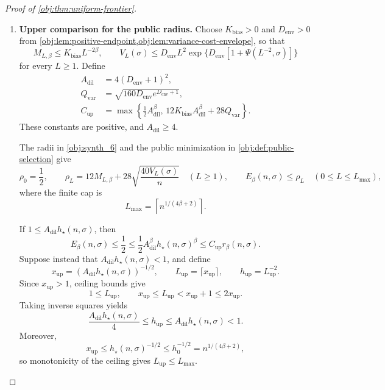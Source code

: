 \documentclass[11pt]{article}
\begin{document}
\begin{proof}[Proof of \cref{obj:thm:uniform-frontier}]
\begin{enumerate}
\item \textbf{Upper comparison for the public radius.}
Choose \(K_{\mathrm{bias}}>0\) and \(D_{\mathrm{env}}>0\) from
\cref{obj:lem:positive-endpoint,obj:lem:variance-cost-envelope}, so that
\[
M_{L,\beta}\le K_{\mathrm{bias}}L^{-2\beta},
\qquad
V_L(\sigma)\le D_{\mathrm{env}}L^2
 \exp\{D_{\mathrm{env}}[1+\Psi(L^{-2},\sigma)]\}
\]
for every \(L\ge1\). Define
\[
\begin{aligned}
A_{\mathrm{dil}}&=4(D_{\mathrm{env}}+1)^2,\\
Q_{\mathrm{var}}&=\sqrt{160D_{\mathrm{env}}e^{D_{\mathrm{env}}+1}},\\
C_{\mathrm{up}}&=\max\left\{
 \frac12A_{\mathrm{dil}}^\beta,\,
 12K_{\mathrm{bias}}A_{\mathrm{dil}}^\beta+28Q_{\mathrm{var}}
 \right\}.
\end{aligned}
\]
These constants are positive, and \(A_{\mathrm{dil}}\ge4\).

The radii in \cref{obj:synth_6} and the public minimization in
\cref{obj:def:public-selection} give
\[
\rho_0=\frac12,\qquad
\rho_L=12M_{L,\beta}+28\sqrt{\frac{40V_L(\sigma)}n}\quad(L\ge1),
\qquad
E_\beta(n,\sigma)\le\rho_L\quad(0\le L\le L_{\max}),
\]
where the finite cap is
\[
L_{\max}=\left\lceil n^{1/(4\beta+2)}\right\rceil.
\]

If \(1\le A_{\mathrm{dil}}h_\star(n,\sigma)\), then
\[
E_\beta(n,\sigma)\le\frac12
\le\frac12A_{\mathrm{dil}}^\beta h_\star(n,\sigma)^\beta
\le C_{\mathrm{up}}r_\beta(n,\sigma).
\]
Suppose instead that \(A_{\mathrm{dil}}h_\star(n,\sigma)<1\), and define
\[
x_{\mathrm{up}}
=(A_{\mathrm{dil}}h_\star(n,\sigma))^{-1/2},
\qquad
L_{\mathrm{up}}=\lceil x_{\mathrm{up}}\rceil,
\qquad
h_{\mathrm{up}}=L_{\mathrm{up}}^{-2}.
\]
Since \(x_{\mathrm{up}}>1\), ceiling bounds give
\[
1\le L_{\mathrm{up}},
\qquad
x_{\mathrm{up}}\le L_{\mathrm{up}}
<x_{\mathrm{up}}+1\le2x_{\mathrm{up}}.
\]
Taking inverse squares yields
\[
\frac{A_{\mathrm{dil}}h_\star(n,\sigma)}4
\le h_{\mathrm{up}}
\le A_{\mathrm{dil}}h_\star(n,\sigma)<1.
\]
Moreover,
\[
x_{\mathrm{up}}
\le h_\star(n,\sigma)^{-1/2}
\le h_0^{-1/2}
=n^{1/(4\beta+2)},
\]
so monotonicity of the ceiling gives \(L_{\mathrm{up}}\le L_{\max}\).


\end{enumerate}
\end{proof}
\end{document}
